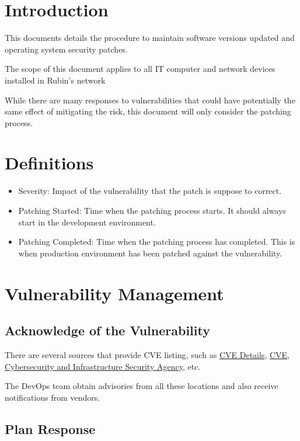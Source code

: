\section{Introduction}

This documents details the procedure to maintain software versions updated and operating system security patches. 

The scope of this document applies to all IT computer and network devices installed in Rubin's network

While there are many responses to vulnerabilities that could have potentially the same effect of mitigating the risk, this document will only consider the patching process. 


\section{Definitions}

\begin{itemize}
    \item Severity: Impact of the vulnerability that the patch is suppose to correct. 
    \item Patching Started: Time when the patching process starts. It should always start in the development environment.
    \item Patching Completed: Time when the patching process has completed. This is when production environment has been patched against the vulnerability.
\end{itemize}

\section{Vulnerability Management}

\subsection{Acknowledge of the Vulnerability}

There are several sources that provide CVE listing, such as \href{https://https://www.cvedetails.com/}{CVE Details}, \href{https://cve.org/}{CVE}, \href{https://www.cisa.gov/known-exploited-vulnerabilities-catalog}{Cybersecurity and Infrastructure Security Agency}, etc. 

The DevOps team obtain advisories from all these locations and also receive notifications from vendors. 

\subsection{Plan Response}

